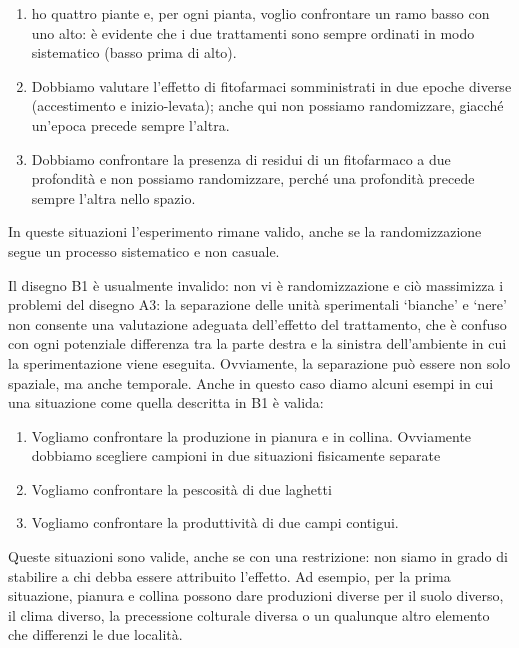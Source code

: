 \documentclass[
  12pt,
]{book}
\providecommand{\tightlist}{%
  \setlength{\itemsep}{0pt}\setlength{\parskip}{0pt}}
\begin{document}
\begin{enumerate}
\def\labelenumi{\arabic{enumi}.}
\tightlist
\item
  ho quattro piante e, per ogni pianta, voglio confrontare un ramo basso con uno alto: è evidente che i due trattamenti sono sempre ordinati in modo sistematico (basso prima di alto).
\item
  Dobbiamo valutare l'effetto di fitofarmaci somministrati in due epoche diverse (accestimento e inizio-levata); anche qui non possiamo randomizzare, giacché un'epoca precede sempre l'altra.
\item
  Dobbiamo confrontare la presenza di residui di un fitofarmaco a due profondità e non possiamo randomizzare, perché una profondità precede sempre l'altra nello spazio.
\end{enumerate}

In queste situazioni l'esperimento rimane valido, anche se la randomizzazione segue un processo sistematico e non casuale.

Il disegno B1 è usualmente invalido: non vi è randomizzazione e ciò massimizza i problemi del disegno A3: la separazione delle unità sperimentali `bianche' e `nere' non consente una valutazione adeguata dell'effetto del trattamento, che è confuso con ogni potenziale differenza tra la parte destra e la sinistra dell'ambiente in cui la sperimentazione viene eseguita. Ovviamente, la separazione può essere non solo spaziale, ma anche temporale. Anche in questo caso diamo alcuni esempi in cui una situazione come quella descritta in B1 è valida:

\begin{enumerate}
\def\labelenumi{\arabic{enumi}.}
\tightlist
\item
  Vogliamo confrontare la produzione in pianura e in collina. Ovviamente dobbiamo scegliere campioni in due situazioni fisicamente separate
\item
  Vogliamo confrontare la pescosità di due laghetti
\item
  Vogliamo confrontare la produttività di due campi contigui.
\end{enumerate}

Queste situazioni sono valide, anche se con una restrizione: non siamo in grado di stabilire a chi debba essere attribuito l'effetto. Ad esempio, per la prima situazione, pianura e collina possono dare produzioni diverse per il suolo diverso, il clima diverso, la precessione colturale diversa o un qualunque altro elemento che differenzi le due località.
\end{document}
